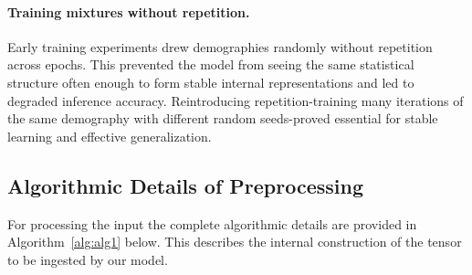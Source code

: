 \documentclass{article}
\begin{document}
\paragraph{Training mixtures without repetition.}
Early training experiments drew demographies randomly without repetition across
epochs. This prevented the model from seeing the same statistical structure
often enough to form stable internal representations and led to degraded
inference accuracy. Reintroducing repetition-training many iterations of the
same demography with different random seeds-proved essential for stable
learning and effective generalization.


\subsection*{Algorithmic Details of Preprocessing}
For processing the input the complete algorithmic details are  provided in Algorithm~\ref{alg:alg1} below.
This describes the internal construction of the tensor to be ingested by our model.
\end{document}
